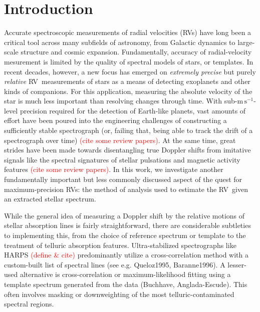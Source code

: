 \documentclass[modern]{aastex61}
\newcommand{\unit}[1]{\mathrm{#1}}
\newcommand{\m}{\unit{m}}
\newcommand{\s}{\unit{s}}
\newcommand{\ms}{\m\,\s^{-1}}
\newcommand{\todo}[1]{\textcolor{red}{#1}}  %
\newcommand{\acronym}[1]{{\small{#1}}}
\newcommand{\RV}{\acronym{RV}}
\begin{document}

\section{Introduction}


Accurate spectroscopic measurements of radial velocities (\RV s) have long been a critical tool across many subfields of astronomy, from Galactic dynamics to large-scale structure and cosmic expansion.
Fundamentally, accuracy of radial-velocity mesurement is limited by the quality of spectral models of stars, or templates.
In recent decades, however, a new focus has emerged on \emph{extremely precise} but purely \emph{relative} \RV\ measurements of stars as a means of detecting exoplanets and other kinds of companions.
For this application, measuring the absolute velocity of the star is much less important than resolving changes through time.
With sub-$\ms$-level precision required for the detection of Earth-like planets, vast amounts of effort have been poured into the engineering challenges of constructing a sufficiently stable spectrograph (or, failing that, being able to track the drift of a spectrograph over time) \todo{(cite some review papers)}. At the same time, great strides have been made towards disentangling true Doppler shifts from imitative signals like the spectral signatures of stellar pulsations and magnetic activity features \todo{(cite some review papers)}.  In this work, we investigate another fundamentally important but less commonly discussed aspect of the quest for maximum-precision \RV s: the method of analysis used to estimate the \RV\ given an extracted stellar spectrum.

While the general idea of measuring a Doppler shift by the relative motions of stellar absorption lines is fairly straightforward, there are considerable subtleties to implementing this, from the choice of reference spectrum or template to the treatment of telluric absorption features. Ultra-stabilized spectrographs like HARPS \todo{(define \& cite)} predominantly utilize a cross-correlation method with a custom-built list of spectral lines (see e.g. Queloz1995, Baranne1996). 
A lesser-used alternative is cross-correlation or maximum-likelihood fitting using a template spectrum generated from the data (Buchhave, Anglada-Escude). 
This often involves masking or downweighting of the most telluric-contaminated spectral regions.
\end{document}

